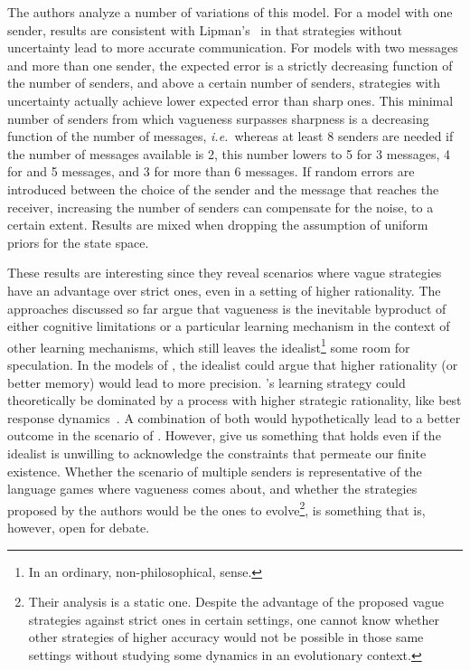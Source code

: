 \documentclass[a4paper]{article}
\begin{document}
The authors analyze a number of variations of this model.
For a model with one sender, results are consistent with Lipman's~\parencite{lipman_why_2009} in that strategies without uncertainty lead to more accurate communication.
For models with two messages and more than one sender, the expected error is a strictly decreasing function of the number of senders, and above a certain number of senders, strategies with uncertainty actually achieve lower expected error than sharp ones.
This minimal number of senders from which vagueness surpasses sharpness is a decreasing function of the number of messages, \emph{i.e.}~whereas at least 8 senders are needed if the number of messages available is 2, this number lowers to 5 for 3 messages, 4 for and 5 messages, and 3 for more than 6 messages.
If random errors are introduced between the choice of the sender and the message that reaches the receiver, increasing the number of senders can compensate for the noise, to a certain extent.
Results are mixed when dropping the assumption of uniform priors for the state space.

These results are interesting since they reveal scenarios where vague strategies have an advantage over strict ones, even in a setting of higher rationality.
The approaches discussed so far argue that vagueness is the inevitable byproduct of either cognitive limitations or a particular learning mechanism in the context of other learning mechanisms, which still leaves the idealist\footnote{In an ordinary, non-philosophical, sense.} some room for speculation.
In the models of \citeauthor{franke_vagueness_2011}, the idealist could argue that higher rationality (or better memory) would lead to more precision.
\citeauthor{oconnor_evolving_2015}'s learning strategy could theoretically be dominated by a process with higher strategic rationality, like best response dynamics~\parencite{ellison_learning_1993}.
A combination of both would hypothetically lead to a better outcome in the scenario of \citeauthor{franke_vagueness_2017}.
However, \citeauthor{lawry_vagueness_2017} give us something that holds even if the idealist is unwilling to acknowledge the constraints that permeate our finite existence.
Whether the scenario of multiple senders is representative of the language games where vagueness comes about, and whether the strategies proposed by the authors would be the ones to evolve\footnote{Their analysis is a static one. Despite the advantage of the proposed vague strategies against strict ones in certain settings, one cannot know whether other strategies of higher accuracy would not be possible in those same settings without studying some dynamics in an evolutionary context.}, is something that is, however, open for debate.
\end{document}
